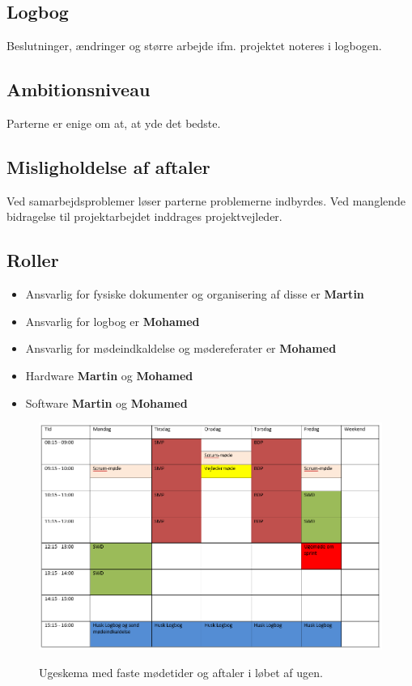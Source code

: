 \subsection*{Logbog}
Beslutninger, ændringer og større arbejde ifm. projektet noteres i logbogen. 

\subsection*{Ambitionsniveau}
Parterne er enige om at, at yde det bedste. 
 
\subsection*{Misligholdelse af aftaler}
Ved samarbejdsproblemer løser parterne problemerne indbyrdes. 
Ved manglende bidragelse til projektarbejdet inddrages projektvejleder.

 
\subsection*{Roller}
\begin{itemize}
\item Ansvarlig for fysiske dokumenter og organisering af disse er \textbf{Martin}
\item Ansvarlig for logbog er \textbf{Mohamed}
\item Ansvarlig for mødeindkaldelse og mødereferater er \textbf{Mohamed}
\item{Hardware \textbf{Martin} og \textbf{Mohamed}}
\item{Software \textbf{Martin} og \textbf{Mohamed}}
\end{itemize}

\begin{figure}[H]
\centering
{\includegraphics[width=16cm]
{Figure/Ugeplan}}
\caption{Ugeskema med faste mødetider og aftaler i løbet af ugen.}
\label{ugeplan}
\end{figure}

